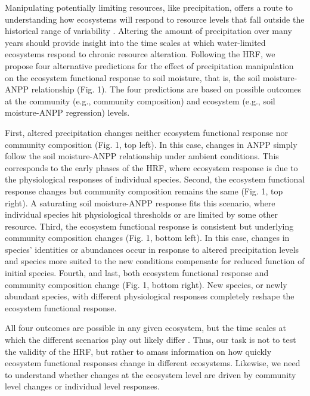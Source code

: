 \documentclass[fleqn,10pt,lineno]{wlpeerj} %
\begin{document}
Manipulating potentially limiting resources, like precipitation, offers
a route to understanding how ecosystems will respond to resource levels
that fall outside the historical range of variability
\citep{Avolio2015, Gherardi2015, Knapp2017}. Altering the amount of
precipitation over many years should provide insight into the time
scales at which water-limited ecosystems respond to chronic resource
alteration. Following the HRF, we propose four alternative predictions
for the effect of precipitation manipulation on the ecosystem functional
response to soil moisture, that is, the soil moisture-ANPP relationship
(Fig. 1). The four predictions are based on possible outcomes at the
community (e.g., community composition) and ecosystem (e.g., soil
moisture-ANPP regression) levels.

First, altered precipitation changes neither ecosystem functional
response nor community composition (Fig. 1, top left). In this case,
changes in ANPP simply follow the soil moisture-ANPP relationship under
ambient conditions. This corresponds to the early phases of the HRF,
where ecosystem response is due to the physiological responses of
individual species. Second, the ecosystem functional response changes
but community composition remains the same (Fig. 1, top right). A
saturating soil moisture-ANPP response fits this scenario, where
individual species hit physiological thresholds or are limited by some
other resource. Third, the ecosystem functional response is consistent
but underlying community composition changes (Fig. 1, bottom left). In
this case, changes in species' identities or abundances occur in
response to altered precipitation levels and species more suited to the
new conditions compensate for reduced function of initial species.
Fourth, and last, both ecosystem functional response and community
composition change (Fig. 1, bottom right). New species, or newly
abundant species, with different physiological responses completely
reshape the ecosystem functional response.

All four outcomes are possible in any given ecosystem, but the time
scales at which the different scenarios play out likely differ
\citep{Smith2009, Wilcox2016, Knapp2017}. Thus, our task is not to test
the validity of the HRF, but rather to amass information on how quickly
ecosystem functional responses change in different ecosystems. Likewise,
we need to understand whether changes at the ecosystem level are driven
by community level changes or individual level responses.
\end{document}

